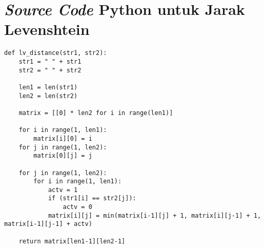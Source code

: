 \chapter{\textit{Source Code} Python untuk Jarak Levenshtein}

\begin{lstlisting}
def lv_distance(str1, str2):
    str1 = " " + str1
    str2 = " " + str2
    
    len1 = len(str1)
    len2 = len(str2)
    
    matrix = [[0] * len2 for i in range(len1)]
    
    for i in range(1, len1):
        matrix[i][0] = i
    for j in range(1, len2):
        matrix[0][j] = j
        
    for j in range(1, len2):
        for i in range(1, len1):
            actv = 1
            if (str1[i] == str2[j]):
                actv = 0
            matrix[i][j] = min(matrix[i-1][j] + 1, matrix[i][j-1] + 1, matrix[i-1][j-1] + actv)
    
    return matrix[len1-1][len2-1]
\end{lstlisting}